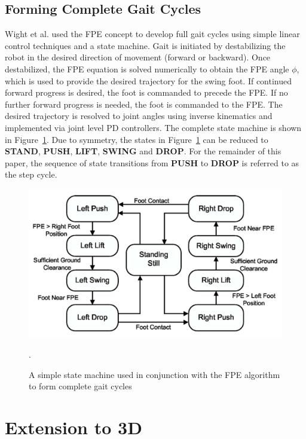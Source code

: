 \subsection{Forming Complete Gait Cycles} %
\label{sub:gait_cycles}
Wight et al. \cite{Wight:2008ii} used the FPE concept to develop full gait cycles using simple linear control techniques and a state machine. Gait is initiated by destabilizing the robot in the desired direction of movement (forward or backward). Once destabilized, the FPE equation is solved numerically to obtain the FPE angle $\phi$, which is used to provide the desired trajectory for the swing foot.  If continued forward progress is desired, the foot is commanded to precede the FPE. If no further forward progress is needed, the foot is commanded to the FPE. The desired trajectory is resolved to joint angles using inverse kinematics and implemented via joint level PD controllers. The complete state machine is shown in Figure~\ref{fig:statemachine}. Due to symmetry, the states in Figure~\ref{fig:statemachine} can be reduced to \textbf{STAND}, \textbf{PUSH}, \textbf{LIFT}, \textbf{SWING} and \textbf{DROP}. For the remainder of this paper, the sequence of state transitions from \textbf{PUSH} to \textbf{DROP} is referred to as the step cycle.

\begin{figure}[!h]
	\centering
    \includegraphics[scale=0.3]{fig/simulations/fpestatemachine.png}
  	\caption{A simple state machine used in conjunction with the FPE algorithm to form complete gait cycles}.
	\label{fig:statemachine}
\end{figure}



\section{Extension to 3D} %
\label{sec:extension_to_3d}

